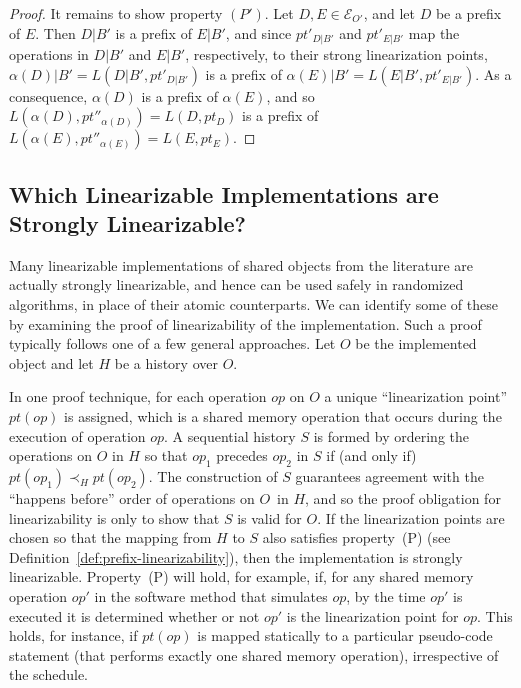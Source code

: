 \documentclass[11pt,letterpaper]{article}
\newcommand{\EE}{\mathcal{E}}
\newcommand{\obj}{\ensuremath{\mathit{O}}}
\newcommand{\op}{\ensuremath{\mathit{op}}}
\begin{document}
\begin{proof}
    It remains to show property $(P')$.
    Let $D,E\in\EE_{O'}$, and let $D$ be a prefix of $E$.
    Then $D|B'$ is a prefix of $E|B'$, and since $pt'_{D|B'}$ and $pt'_{E|B'}$ map the operations in $D|B'$ and $E|B'$, respectively, to their strong linearization points, $\alpha(D)|B'=L(D|B',pt'_{D|B'})$ is a prefix of $\alpha(E)|B'=L(E|B',pt'_{E|B'})$.
    As a consequence, $\alpha(D)$ is a prefix of $\alpha(E)$, and so $L(\alpha(D),pt''_{\alpha(D)})=L(D,pt_D)$ is a prefix of $L(\alpha(E),pt''_{\alpha(E)})=L(E,pt_E)$.
\end{proof}

\subsection{Which Linearizable Implementations are Strongly Linearizable?}

Many linearizable implementations of shared objects from the literature are actually strongly linearizable,
and hence can be used safely in randomized algorithms, in place of their atomic counterparts.
We can identify some of these by examining the proof of linearizability of the implementation.
Such a proof typically follows one of a few general approaches.
Let $\obj$ be the implemented object and let $H$ be a history over $\obj$.

In one proof technique, for each operation $\op$ on $\obj$ a unique ``linearization point'' $pt(\op)$ is assigned,
which is a shared memory operation that occurs during the execution of operation $\op$.
A sequential history $S$ is formed by ordering the operations on $\obj$ in $H$ so that $\op_1$ precedes $\op_2$ in $S$ if (and only if)
$pt(\op_1) \prec_H pt(\op_2)$.
The construction of $S$ guarantees agreement with the ``happens before'' order of operations on \obj\ in $H$,
and so the proof obligation for linearizability is only to show that $S$ is valid for \obj.
If the linearization points are chosen so that the mapping from $H$ to $S$ also satisfies
property~(P) (see Definition~\ref{def:prefix-linearizability}), then the implementation is strongly linearizable.
Property~(P) will hold, for example, if, for any shared memory operation $\op'$ in the software method that simulates $\op$,
by the time $\op'$ is executed it is determined whether or not $\op'$ is the linearization point for $\op$.
This holds, for instance, if $pt(\op)$ is mapped statically to a particular pseudo-code statement
(that performs exactly one shared memory operation), irrespective of the schedule.
\end{document}
